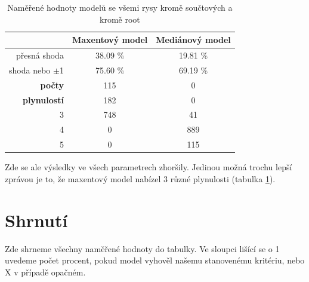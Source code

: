 \documentclass[12pt,a4paper]{report}
\begin{document}
\begin{table}[!htbp]
\begin{center}
\begin{tabular}{|r|c|c|}
\hline
 & \textbf{Maxentový model} & \textbf{Mediánový model} \\
 \hline
přesná shoda & 38.09 \%  & 19.81 \%  \\
\hline
shoda nebo $\pm$1 & 75.60 \% & 69.19 \%  \\
\hline
     \textbf{počty} \quad 1 & 115   & \color{red} 0   \\
\textbf{plynulostí} \quad 2 & 182 & \color{red}0   \\
                          3 & 748 & 41 \\
                          4 & \color{red}0   & 889 \\
                          5 & \color{red}0   & 115  \\
\hline
\end{tabular}
\caption{Naměřené hodnoty modelů se všemi rysy kromě součtových a kromě root}\label{tb:woutsumsroot}
\end{center}
\end{table}

Zde se ale výsledky ve všech parametrech zhoršily. Jedinou možná trochu lepší zprávou je to, že maxentový model nabízel 3 různé plynulosti (tabulka \ref{tb:woutsumsroot}).


\section{Shrnutí}
Zde shrneme všechny naměřené hodnoty do tabulky. Ve sloupci lišící se o 1 uvedeme počet procent, pokud model vyhověl našemu stanovenému kritériu, nebo X v případě opačném.
\end{document}
